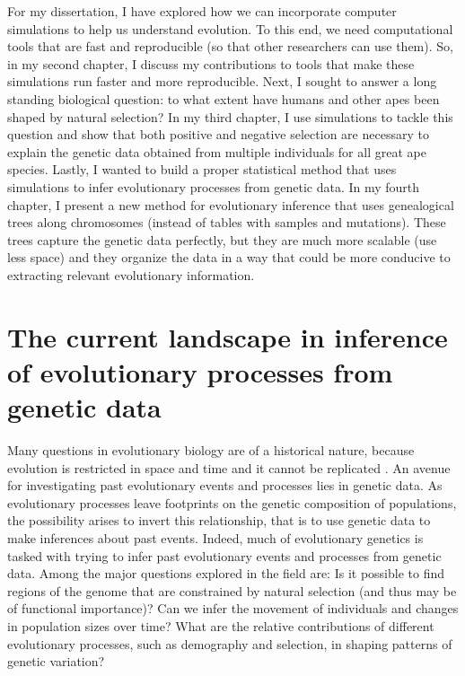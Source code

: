 For my dissertation, I have explored how we can incorporate computer simulations to help us understand evolution.
To this end, we need computational tools that are fast and reproducible (so that other researchers can use them).
So, in my second chapter, I discuss my contributions to tools that make these simulations run faster and more reproducible.
Next, I sought to answer a long standing biological question: to what extent have humans and other apes been shaped by natural selection?
In my third chapter, I use simulations to tackle this question and show that both positive and negative selection are necessary to explain the genetic data obtained from multiple individuals for all great ape species.
Lastly, I wanted to build a proper statistical method that uses simulations to infer evolutionary processes from genetic data.
In my fourth chapter, I present a new method for evolutionary inference that uses genealogical trees along chromosomes
(instead of tables with samples and mutations).
These trees capture the genetic data perfectly, but they are much more scalable (use less space) and
they organize the data in a way that could be more conducive to extracting relevant evolutionary information.

\section{The current landscape in inference of evolutionary processes from genetic data}

Many questions in evolutionary biology are of a historical nature,
because evolution is restricted in space and time and it cannot be replicated \citep{losos_evolutionary_2009, cleland_methodological_2002}.
An avenue for investigating past evolutionary events and processes lies in genetic data.
As evolutionary processes leave footprints on the genetic composition of populations,
the possibility arises to invert this relationship,
that is to use genetic data to make inferences about past events.
Indeed, much of evolutionary genetics is tasked with trying to infer past evolutionary events and processes from genetic data.
Among the major questions explored in the field are: 
Is it possible to find regions of the genome that are constrained by natural selection (and thus may be of functional importance)?
Can we infer the movement of individuals and changes in population sizes over time?
What are the relative contributions of different evolutionary processes, such as demography and selection, in shaping patterns of genetic variation? 

